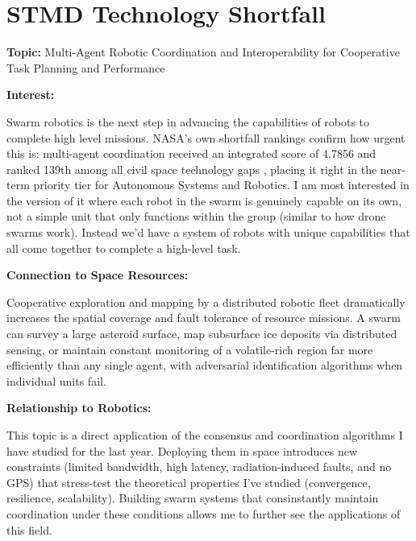 \documentclass[11pt]{article}
\begin{document}
\section*{STMD Technology Shortfall}

\noindent\textbf{Topic:} Multi-Agent Robotic Coordination and
Interoperability for Cooperative Task Planning and
Performance \cite{stmdShortfall}

\noindent\textbf{Interest:}

Swarm robotics is the next step in advancing the capabilities of robots to complete high level missions. NASA's own shortfall rankings
confirm how urgent this is: multi-agent coordination received an integrated score of 4.7856 and ranked 139th among all civil space technology
gaps \cite{stmdShortfall}, placing it right in the near-term priority tier for Autonomous Systems and Robotics. I am most interested in the 
version of it where each robot in the swarm is genuinely capable on its own, not a simple unit that only functions
within the group (similar to how drone swarms work). Instead we'd have a system of robots with unique capabilities
that all come together to complete a high-level task.

\noindent\textbf{Connection to Space Resources:}

Cooperative exploration and mapping by a distributed robotic fleet dramatically increases the spatial coverage
and fault tolerance of resource missions. A swarm can survey a large asteroid surface, map subsurface ice deposits via 
distributed sensing, or maintain constant monitoring of a volatile-rich region far more efficiently than any single agent, 
with adversarial identification algorithms when individual units fail.

\noindent\textbf{Relationship to Robotics:}

This topic is a direct application of the consensus and coordination algorithms I have studied for the last year.
Deploying them in space introduces new constraints (limited bandwidth, high latency, radiation-induced faults, and no GPS) 
that stress-test the theoretical properties I've studied (convergence, resilience, scalability). Building swarm systems 
that consinstantly maintain coordination under these conditions allows me to further see the applications of this field.



\end{document}
